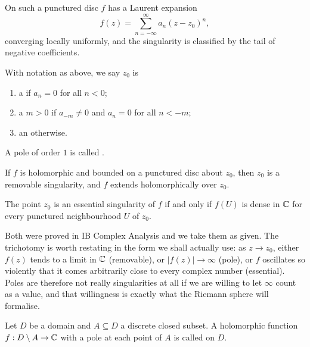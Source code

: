 \documentclass[a4paper]{scrartcl}
\begin{document}
On such a punctured disc $f$ has a Laurent expansion
$$
f(z) = \sum_{n = -\infty}^{\infty} a_n (z - z_0)^n,
$$
converging locally uniformly, and the singularity is classified by the tail of negative
coefficients.

\begin{definition}
	With notation as above, we say $z_0$ is
	\begin{enumerate}[label=(\roman*)]
		\item a  if $a_n = 0$ for all $n < 0$;
		\item a  $m > 0$ if $a_{-m} \neq 0$ and $a_n = 0$ for all $n < -m$;
		\item an  otherwise.
	\end{enumerate}
	A pole of order $1$ is called .
\end{definition}

\begin{theorem}\label{thm:removable}
	If $f$ is holomorphic and bounded on a punctured disc about $z_0$, then $z_0$ is a
	removable singularity, and $f$ extends holomorphically over $z_0$.
\end{theorem}

\begin{theorem}\label{thm:casorati}
	The point $z_0$ is an essential singularity of $f$ if and only if $f(U)$ is dense in
	$\mathbb{C}$ for every punctured neighbourhood $U$ of $z_0$.
\end{theorem}

Both were proved in IB Complex Analysis and we take them as given. The trichotomy is
worth restating in the form we shall actually use: as $z \to z_0$, either $f(z)$ tends to
a limit in $\mathbb{C}$ (removable), or $|f(z)| \to \infty$ (pole), or $f$ oscillates so violently
that it comes arbitrarily close to every complex number (essential). Poles are therefore
not really singularities at all if we are willing to let $\infty$ count as a value, and
that willingness is exactly what the Riemann sphere will formalise.

\begin{definition}
	Let $D$ be a domain and $A \subseteq D$ a discrete closed subset. A holomorphic
	function $f : D \setminus A \to \mathbb{C}$ with a pole at each point of $A$ is called
	 on $D$.
\end{definition}
\end{document}
